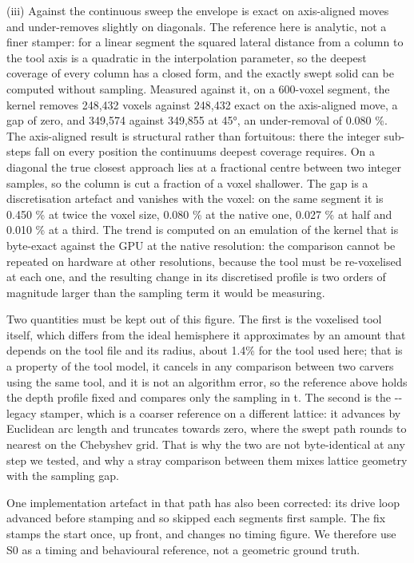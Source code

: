 \documentclass[
]{article}
\begin{document}
(iii) Against the continuous sweep the envelope is exact on axis-aligned
moves and under-removes slightly on diagonals. The reference here is
analytic, not a finer stamper: for a linear segment the squared lateral
distance from a column to the tool axis is a quadratic in the
interpolation parameter, so the deepest coverage of every column has a
closed form, and the exactly swept solid can be computed without
sampling. Measured against it, on a 600-voxel segment, the kernel
removes 248,432 voxels against 248,432 exact on the axis-aligned move, a
gap of zero, and 349,574 against 349,855 at 45°, an under-removal of
0.080 \%. The axis-aligned result is structural rather than fortuitous:
there the integer sub-steps fall on every position the
continuum\textquotesingle s deepest coverage requires. On a diagonal the
true closest approach lies at a fractional centre between two integer
samples, so the column is cut a fraction of a voxel shallower. The gap
is a discretisation artefact and vanishes with the voxel: on the same
segment it is 0.450 \% at twice the voxel size, 0.080 \% at the native
one, 0.027 \% at half and 0.010 \% at a third. The trend is computed on
an emulation of the kernel that is byte-exact against the GPU at the
native resolution: the comparison cannot be repeated on hardware at
other resolutions, because the tool must be re-voxelised at each one,
and the resulting change in its discretised profile is two orders of
magnitude larger than the sampling term it would be measuring.

Two quantities must be kept out of this figure. The first is the
voxelised tool itself, which differs from the ideal hemisphere it
approximates by an amount that depends on the tool file and its radius,
about 1.4\% for the tool used here; that is a property of the tool
model, it cancels in any comparison between two carvers using the same
tool, and it is not an algorithm error, so the reference above holds the
depth profile fixed and compares only the sampling in t. The second is
the -\/-legacy stamper, which is a coarser reference on a different
lattice: it advances by Euclidean arc length and truncates towards zero,
where the swept path rounds to nearest on the Chebyshev grid. That is
why the two are not byte-identical at any step we tested, and why a
stray comparison between them mixes lattice geometry with the sampling
gap.

One implementation artefact in that path has also been corrected: its
drive loop advanced before stamping and so skipped each
segment\textquotesingle s first sample. The fix stamps the start once,
up front, and changes no timing figure. We therefore use S0 as a timing
and behavioural reference, not a geometric ground truth.
\end{document}
